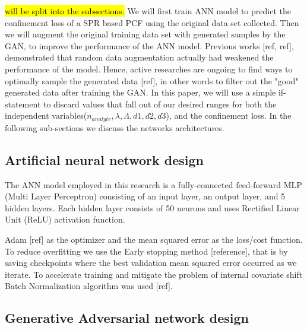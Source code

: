 \documentclass[draft, a4, 10pt, onecolumn]{IEEEtran}
\begin{document}
\hl{will be split into the subsections.} We will first train ANN model to predict the confinement loss of a SPR based PCF using the original data set collected. Then we will augment the original training data set with generated samples by the GAN, to improve the performance of the ANN model.
Previous works [ref, ref], demonstrated that random data augmentation actually had weakened the performance of the model. Hence, active researches are ongoing to find ways to optimally sample the generated data [ref], in other words to filter out the "good" generated data after training the GAN. In this paper, we will use a simple if-statement to discard values that fall out of our desired ranges for both the independent variables($n_{analyte}, \lambda, \Lambda, d1, d2, d3$), and the confinement loss. In the following sub-sections we discuss the networks architectures.

\subsection{Artificial neural network design}
\label{ssec:ann}
The ANN model employed in this research is a fully-connected feed-forward MLP (Multi Layer Perceptron) consisting of an input layer, an output layer, and 5 hidden layers. Each hidden layer consists of 50 neurons and uses Rectified Linear Unit (ReLU) activation function. 

Adam [ref] as the optimizer and the mean squared error as the loss/cost function. To reduce overfitting we use the Early stopping method [reference], that is by saving checkpoints where the best validation mean squared error occurred as we iterate. To accelerate training and mitigate the problem of internal covariate shift Batch Normalization algorithm was used [ref].

\subsection{Generative Adversarial network design}
\label{ssec:gan}
\end{document}
